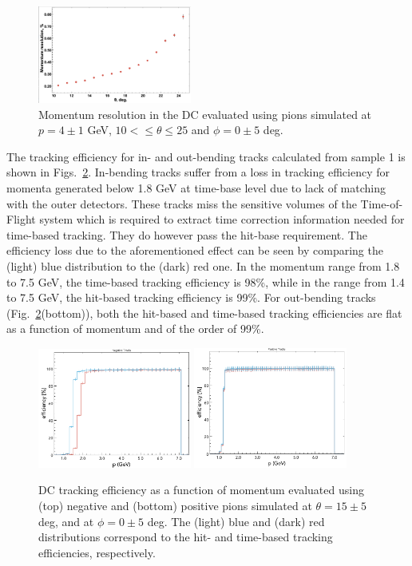\begin{figure}
\includegraphics[width=0.45\textwidth]{pics/DCRes2.png}
\caption{Momentum resolution in the DC evaluated using  pions  simulated at $p=4\pm 1$ GeV, $10<\leq \theta\leq 25$ and $\phi = 0 \pm 5$ deg.
}
\label{fig:restheta}
\end{figure}

The tracking efficiency for in- and out-bending tracks calculated from sample 1 is shown in  Figs.~\ref{fig:trkeff}.  In-bending tracks suffer from a loss in tracking efficiency for momenta generated below 1.8 GeV at time-base level due to lack of matching with the outer detectors.  These tracks miss the sensitive volumes of the Time-of-Flight system which is required to extract time correction information needed for time-based tracking.  They do however pass the hit-base requirement.  The efficiency loss due to the aforementioned effect can be seen by comparing the (light) blue distribution to the (dark) red one.  In the momentum range from 1.8 to 7.5 GeV, the time-based tracking efficiency is 98\%, while in the range from 1.4 to 7.5 GeV, the hit-based tracking efficiency is 99\%.  For out-bending tracks (Fig.~\ref{fig:trkeff}(bottom)), both the hit-based and time-based tracking efficiencies are flat as a function of momentum and of the order of 99\%. 


\begin{figure}
\includegraphics[width=0.45\textwidth]{pics/DCTrkgEffNegTrks.png}
\includegraphics[width=0.45\textwidth]{pics/DCTrkgEffPosTrks.png}
\caption{DC tracking efficiency as a function of momentum evaluated using  (top) negative and (bottom) positive pions simulated at $\theta =15\pm 5$ deg, and at $\phi = 0 \pm 5$ deg. The (light) blue and (dark) red distributions correspond to the hit- and time-based tracking efficiencies, respectively.
}
\label{fig:trkeff}
\end{figure}


